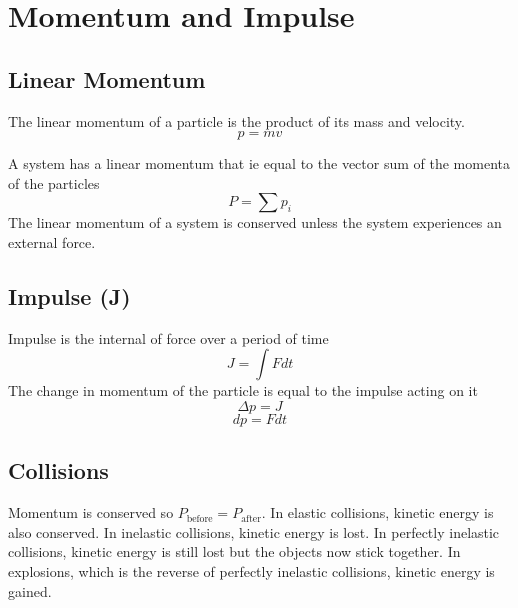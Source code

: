 \section{Momentum and Impulse}

\subsection{Linear Momentum}
The linear momentum of a particle is the product of its mass and velocity.
\[p=mv\]

A system has a linear momentum that ie equal to the vector sum of the momenta of the particles
\[P=\sum p_i\]
The linear momentum of a system is conserved unless the system experiences an external force.

\subsection{Impulse (J)}
Impulse is the internal of force over a period of time
\[J=\int F dt\]
The change in momentum of the particle is equal to the impulse acting on it
\[\Delta p = J\]
\[dp=F dt\]


\subsection{Collisions}
Momentum is conserved so $P_\text{before}=P_\text{after}$. In elastic collisions, kinetic energy is also conserved. In inelastic collisions, kinetic energy is lost. In perfectly inelastic collisions, kinetic energy is still lost but the objects now stick together. In explosions, which is the reverse of perfectly inelastic collisions, kinetic energy is gained.